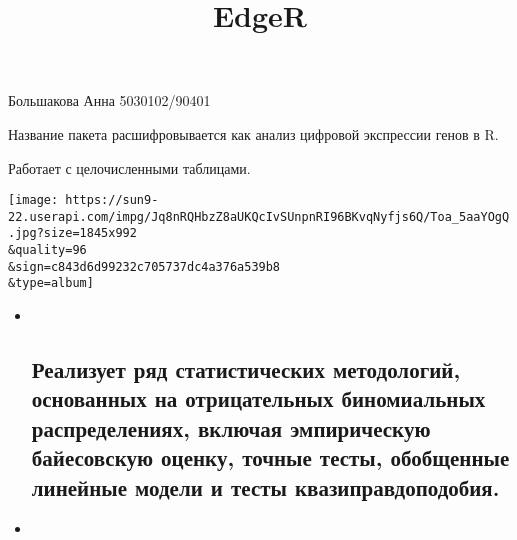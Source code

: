 \documentclass[
]{article}
\title{EdgeR}
\author{}
\date{\vspace{-2.5em}}
\begin{document}
\maketitle

Большакова Анна 5030102/90401

Название пакета расшифровывается как анализ цифровой экспрессии генов в
R.

Работает с целочисленными таблицами.

\texttt{[image: https://sun9-22.userapi.com/impg/Jq8nRQHbzZ8aUKQcIvSUnpnRI96BKvqNyfjs6Q/Toa\_5aaYOgQ.jpg?size=1845x992\\\&quality=96\\\&sign=c843d6d99232c705737dc4a376a539b8\\\&type=album]}

\begin{itemize}
\item ~
  \hypertarget{ux440ux435ux430ux43bux438ux437ux443ux435ux442-ux440ux44fux434-ux441ux442ux430ux442ux438ux441ux442ux438ux447ux435ux441ux43aux438ux445-ux43cux435ux442ux43eux434ux43eux43bux43eux433ux438ux439-ux43eux441ux43dux43eux432ux430ux43dux43dux44bux445-ux43dux430-ux43eux442ux440ux438ux446ux430ux442ux435ux43bux44cux43dux44bux445-ux431ux438ux43dux43eux43cux438ux430ux43bux44cux43dux44bux445-ux440ux430ux441ux43fux440ux435ux434ux435ux43bux435ux43dux438ux44fux445-ux432ux43aux43bux44eux447ux430ux44f-ux44dux43cux43fux438ux440ux438ux447ux435ux441ux43aux443ux44e-ux431ux430ux439ux435ux441ux43eux432ux441ux43aux443ux44e-ux43eux446ux435ux43dux43aux443-ux442ux43eux447ux43dux44bux435-ux442ux435ux441ux442ux44b-ux43eux431ux43eux431ux449ux435ux43dux43dux44bux435-ux43bux438ux43dux435ux439ux43dux44bux435-ux43cux43eux434ux435ux43bux438-ux438-ux442ux435ux441ux442ux44b-ux43aux432ux430ux437ux438ux43fux440ux430ux432ux434ux43eux43fux43eux434ux43eux431ux438ux44f.}{%
  \subsection{Реализует ряд статистических методологий, основанных на
  отрицательных биномиальных распределениях, включая эмпирическую
  байесовскую оценку, точные тесты, обобщенные линейные модели и тесты
  квазиправдоподобия.}\label{ux440ux435ux430ux43bux438ux437ux443ux435ux442-ux440ux44fux434-ux441ux442ux430ux442ux438ux441ux442ux438ux447ux435ux441ux43aux438ux445-ux43cux435ux442ux43eux434ux43eux43bux43eux433ux438ux439-ux43eux441ux43dux43eux432ux430ux43dux43dux44bux445-ux43dux430-ux43eux442ux440ux438ux446ux430ux442ux435ux43bux44cux43dux44bux445-ux431ux438ux43dux43eux43cux438ux430ux43bux44cux43dux44bux445-ux440ux430ux441ux43fux440ux435ux434ux435ux43bux435ux43dux438ux44fux445-ux432ux43aux43bux44eux447ux430ux44f-ux44dux43cux43fux438ux440ux438ux447ux435ux441ux43aux443ux44e-ux431ux430ux439ux435ux441ux43eux432ux441ux43aux443ux44e-ux43eux446ux435ux43dux43aux443-ux442ux43eux447ux43dux44bux435-ux442ux435ux441ux442ux44b-ux43eux431ux43eux431ux449ux435ux43dux43dux44bux435-ux43bux438ux43dux435ux439ux43dux44bux435-ux43cux43eux434ux435ux43bux438-ux438-ux442ux435ux441ux442ux44b-ux43aux432ux430ux437ux438ux43fux440ux430ux432ux434ux43eux43fux43eux434ux43eux431ux438ux44f.}}
\item ~
  \hypertarget{ux43fux440ux438ux43cux435ux43dux44fux435ux442ux441ux44f-ux434ux43bux44f}{%
}
\end{itemize}
\end{document}
